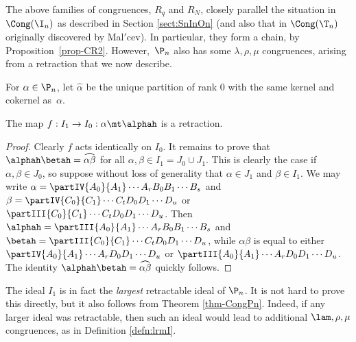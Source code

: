 The above families of congruences, $R_q$ and $R_N$, closely parallel the situation in  $\Cong(\I_n)$
as described in Section \ref{sect:SnInOn}
(and also that in $\Cong(\T_n)$ originally discovered by Mal$'$cev).
In particular, they form a chain, by Proposition~\ref{prop-CR2}.
However,~$\P_n$ also has some $\lambda,\rho,\mu$ congruences, arising from a retraction that we now describe.


\begin{definition}
\label{defn:hat}
For $\alpha\in\P_n$, let $\widehat{\alpha}$ be the unique partition of rank $0$ with the same kernel and cokernel as~$\alpha$.~
\end{definition}


\begin{lemma}
\label{HatRetract}
The map $f: I_1\rightarrow I_0:\alpha\mt\alphah$ is a retraction.
\end{lemma}

\begin{proof}
Clearly $f$ acts identically on $I_0$.  It remains to prove that $\alphah\betah=\widehat{\alpha\beta}$ for all ${\alpha,\beta\in I_1=J_0\cup J_1}$.  This is clearly the case if ${\alpha,\beta\in J_0}$, so suppose without loss of generality that $\alpha\in J_1$ and $\beta\in I_1$.  We may write $\alpha=\partIV{A_0}{A_1}\cdots{A_r}{B_0}{B_1}\cdots{B_s}$ and $\beta=\partIV{C_0}{C_1}\cdots{C_t}{D_0}{D_1}\cdots{D_u}$ or $\partIII{C_0}{C_1}\cdots{C_t}{D_0}{D_1}\cdots{D_u}$.  Then $\alphah=\partIII{A_0}{A_1}\cdots{A_r}{B_0}{B_1}\cdots{B_s}$ and $\betah = \partIII{C_0}{C_1}\cdots{C_t}{D_0}{D_1}\cdots{D_u}$, while $\alpha\beta$ is equal to either $\partIV{A_0}{A_1}\cdots{A_r}{D_0}{D_1}\cdots{D_u}$ or $\partIII{A_0}{A_1}\cdots{A_r}{D_0}{D_1}\cdots{D_u}$.  The identity $\alphah\betah=\widehat{\alpha\beta}$ quickly follows. \end{proof}

The ideal $I_1$ is in fact the \emph{largest} retractable ideal of $\P_n$.  It is not hard to prove this directly, but it also follows from Theorem \ref{thm-CongPn}.  Indeed, if any larger ideal was retractable, then such an ideal would lead to additional $\lam,\rho,\mu$ congruences, as in Definition \ref{defn:lrmI}.





